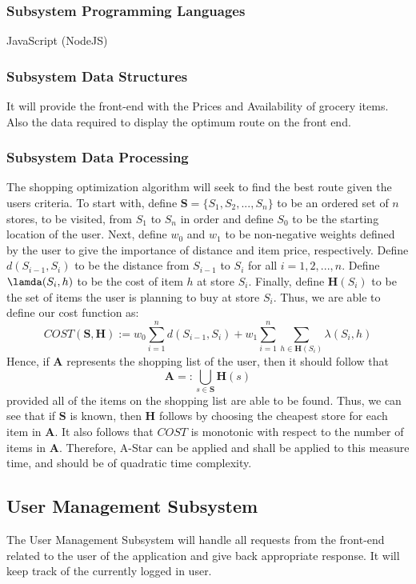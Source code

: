\subsubsection{Subsystem Programming Languages}
JavaScript (NodeJS)

\subsubsection{Subsystem Data Structures}
It will provide the front-end with the Prices and Availability of grocery items. Also the data required to display the optimum route on the front end.

\subsubsection{Subsystem Data Processing}
The shopping optimization algorithm will seek to find the best route given the users criteria.
To start with, define $\textbf{S} = \{S_1,S_2,...,S_n\}$ to be an ordered set of $n$ stores, to be visited, from $S_1$ to $S_n$ in order and define $S_0$ to be the starting location of the user.  Next, define $w_0$ and $w_1$ to be non-negative weights
defined by the user to give the importance of distance and item price, respectively.  Define $d(S_{i-1},S_i)$ to be the distance from $S_{i-1}$ to $S_i$ for all $i=1,2,...,n$.
Define $\lamda(S_i,h)$ to be the cost of item $h$ at store $S_i$.  Finally, define $\textbf{H}(S_i)$ to be the set of items the user is planning to buy at store $S_i$.  Thus, we are able to define our cost function as:
\begin{equation}
	COST(\textbf{S},\textbf{H}) := w_0\sum_{i=1}^n d(S_{i-1},S_i) + w_1\sum_{i=1}^n \sum_{h\in\textbf{H}(S_i)} \lambda(S_i,h)
\end{equation}
Hence, if $\textbf{A}$ represents the shopping list of the user, then it should follow that
\begin{equation}
	\textbf{A} =: \bigcup_{s\in\textbf{S}}\textbf{H}(s)
\end{equation}
provided all of the items on the shopping list are able to be found.
Thus, we can see that if $\textbf{S}$ is known, then $\textbf{H}$ follows by choosing the cheapest store for each item in $\textbf{A}$.  It also follows that $COST$ is monotonic with respect to the number of items in $\textbf{A}$.
Therefore, A-Star can be applied and shall be applied to this measure time, and should be of quadratic time complexity.
\subsection{User Management Subsystem}
The User Management Subsystem will handle all requests from the front-end related to the user of the
application and give back appropriate response. It will keep track of the currently logged in user.

